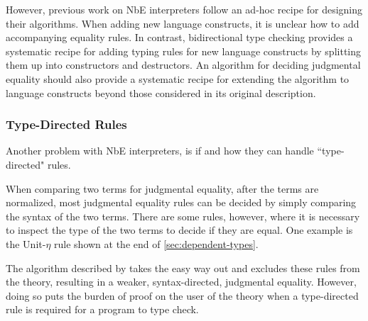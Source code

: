 \documentclass[sigplan,nonacm]{acmart}
\begin{document}
However, previous work on NbE interpreters follow an ad-hoc recipe for designing their algorithms.
When adding new language constructs, it is unclear how to add accompanying equality rules.
In contrast, bidirectional type checking provides a systematic recipe for adding typing rules for new language constructs by splitting them up into constructors and destructors.
An algorithm for deciding judgmental equality should also provide a systematic recipe for extending the algorithm to language constructs beyond those considered in its original description.


\subsubsection{Type-Directed Rules}

Another problem with NbE interpreters, is if and how they can handle ``type-directed" rules.

When comparing two terms for judgmental equality, after the terms are normalized, most judgmental equality rules can be decided by simply comparing the syntax of the two terms.
There are some rules, however, where it is necessary to inspect the type of the two terms to decide if they are equal.
One example is the Unit-$\eta$ rule shown at the end of \autoref{sec:dependent-types}.

The algorithm described by \citet{Coquand1996} takes the easy way out and excludes these rules from the theory, resulting in a weaker, syntax-directed, judgmental equality.
However, doing so puts the burden of proof on the user of the theory when a type-directed rule is required for a program to type check.
\end{document}
